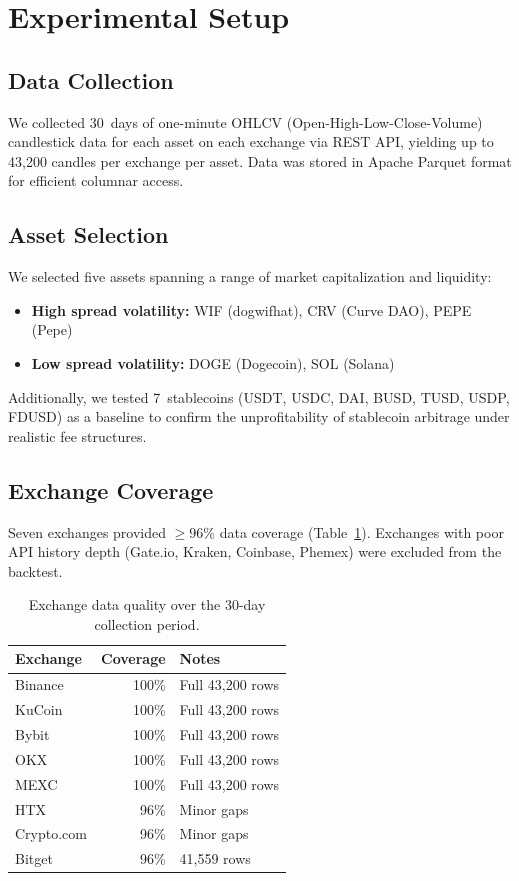 \documentclass[sigconf,nonacm=false]{acmart}
\begin{document}
\section{Experimental Setup}\label{sec:setup}

\subsection{Data Collection}

We collected 30~days of one-minute OHLCV (Open-High-Low-Close-Volume) candlestick data for each asset on each exchange via REST API, yielding up to 43,200 candles per exchange per asset. Data was stored in Apache Parquet format for efficient columnar access.

\subsection{Asset Selection}

We selected five assets spanning a range of market capitalization and liquidity:
\begin{itemize}
    \item \textbf{High spread volatility:} WIF (dogwifhat), CRV (Curve DAO), PEPE (Pepe)
    \item \textbf{Low spread volatility:} DOGE (Dogecoin), SOL (Solana)
\end{itemize}
Additionally, we tested 7~stablecoins (USDT, USDC, DAI, BUSD, TUSD, USDP, FDUSD) as a baseline to confirm the unprofitability of stablecoin arbitrage under realistic fee structures.

\subsection{Exchange Coverage}

Seven exchanges provided $\geq 96$\% data coverage (Table~\ref{tab:exchanges}). Exchanges with poor API history depth (Gate.io, Kraken, Coinbase, Phemex) were excluded from the backtest.

\begin{table}[h]
\caption{Exchange data quality over the 30-day collection period.}
\label{tab:exchanges}
\begin{tabular}{lrl}
\toprule
\textbf{Exchange} & \textbf{Coverage} & \textbf{Notes} \\
\midrule
Binance   & 100\% & Full 43,200 rows \\
KuCoin    & 100\% & Full 43,200 rows \\
Bybit     & 100\% & Full 43,200 rows \\
OKX       & 100\% & Full 43,200 rows \\
MEXC      & 100\% & Full 43,200 rows \\
HTX       & 96\%  & Minor gaps \\
Crypto.com & 96\% & Minor gaps \\
Bitget    & 96\%  & 41,559 rows \\
\bottomrule
\end{tabular}
\end{table}
\end{document}
